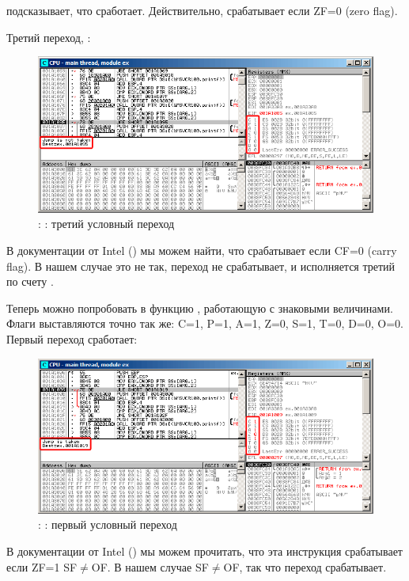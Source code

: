 \olly подсказывает, что \JNZ сработает.
Действительно, \JNZ срабатывает если ZF=0 (zero flag).

\clearpage
Третий переход, \JNB:

\begin{figure}[H]
\centering
\includegraphics[scale=\FigScale]{patterns/07_jcc/simple/olly_unsigned3.png}
\caption{\olly: : третий условный переход}
\label{fig:jcc_olly_unsigned_3}
\end{figure}

В документации от Intel () мы можем найти,
что \JNB срабатывает если CF=0 (carry flag).
В нашем случае это не так, переход не срабатывает, и исполняется третий по счету \printf.

\clearpage
Теперь можно попробовать в \olly функцию , работающую с знаковыми величинами.
Флаги выставляются точно так же: C=1, P=1, A=1, Z=0, S=1, T=0, D=0, O=0.
Первый переход \JLE сработает:

\begin{figure}[H]
\centering
\includegraphics[scale=\FigScale]{patterns/07_jcc/simple/olly_signed1.png}
\caption{\olly: : первый условный переход}
\label{fig:jcc_olly_signed_1}
\end{figure}

В документации от Intel () мы можем прочитать, что эта инструкция срабатывает если ZF=1 \OrENRU SF$\neq$OF.
В нашем случае SF$\neq$OF, так что переход срабатывает.

